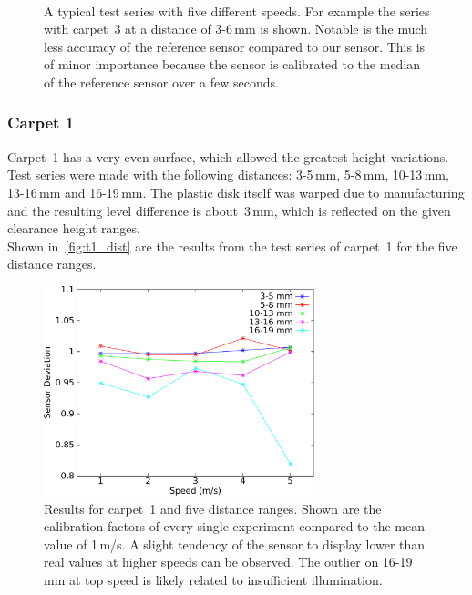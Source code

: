 \documentclass[12pt,a4paper]{article}
\begin{document}
\begin{figure}[htbp]
\begin{center}
{      }
    \mbox{
      }
    \caption{
      A typical test series with five different speeds.
      For example the series with carpet~3 at a distance of 3-6\,mm is shown. 
      Notable is the much less accuracy of the reference sensor compared to our sensor.
      This is of minor importance because the sensor is calibrated to the median of the reference sensor over a few seconds.
    }
    \label{fig:series}
  \end{center}
\end{figure}



\subsubsection{Carpet 1}

Carpet~1 has a very even surface, which allowed the greatest height variations. 
Test series were made with the following distances: 3-5\,mm, 5-8\,mm, 10-13\,mm, 13-16\,mm and 16-19\,mm.
The plastic disk itself was warped due to manufacturing and the resulting level difference is about~3\,mm, which is reflected on the given clearance height ranges.\\
Shown in~\autoref{fig:t1_dist} are the results from the test series of carpet~1 for the five distance ranges.

\begin{figure}[htbp]
\begin{center}
\includegraphics[width=0.7\textwidth]{figures/T1_dist.pdf}
\caption{\label{fig:t1_dist}
Results for carpet~1 and five distance ranges. 
Shown are the calibration factors of every single experiment compared to the mean value of 1\,m/s.
A slight tendency of the sensor to display lower than real values at higher speeds can be observed.
The outlier on 16-19\,mm at top speed is likely related to insufficient illumination.
}
\end{center}
\end{figure}
\end{document}
